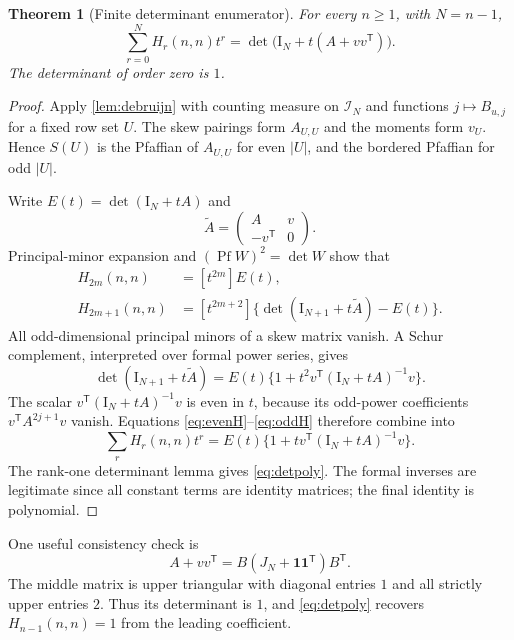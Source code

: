 \documentclass[11pt]{article}
\numberwithin{equation}{section}
\newtheorem{theorem}{Theorem}[section]
\theoremstyle{definition}
\newcommand{\one}{\mathbf{1}}
\newcommand{\Id}{\mathrm{I}}
\newcommand{\Pf}{\operatorname{Pf}}
\newcommand{\coeff}[2]{[#1^{#2}]}
\begin{document}
\begin{theorem}[Finite determinant enumerator]\label{thm:detpoly}
For every $n\geq1$, with $N=n-1$,
\begin{equation}\label{eq:detpoly}
 \boxed{\displaystyle
 \sum_{r=0}^{N}H_r(n,n)t^r
 =\det\bigl(\Id_N+t(A+vv^{\mathsf T})\bigr).}
\end{equation}
The determinant of order zero is $1$.
\end{theorem}

\begin{proof}
Apply \cref{lem:debruijn} with counting measure on $\mathcal I_N$ and functions $j\mapsto B_{u,j}$ for a fixed row set $U$. The skew pairings form $A_{U,U}$ and the moments form $v_U$. Hence $S(U)$ is the Pfaffian of $A_{U,U}$ for even $|U|$, and the bordered Pfaffian for odd $|U|$.

Write $E(t)=\det(\Id_N+tA)$ and
\[
 \widetilde A=\begin{pmatrix}A&v\\-v^{\mathsf T}&0\end{pmatrix}.
\]
Principal-minor expansion and $(\Pf W)^2=\det W$ show that
\begin{align}
 H_{2m}(n,n)&=\coeff{t}{2m}E(t),\label{eq:evenH}\\
 H_{2m+1}(n,n)&=\coeff{t}{2m+2}
      \{\det(\Id_{N+1}+t\widetilde A)-E(t)\}.\label{eq:oddH}
\end{align}
All odd-dimensional principal minors of a skew matrix vanish. A Schur complement, interpreted over formal power series, gives
\[
 \det(\Id_{N+1}+t\widetilde A)
 =E(t)\{1+t^2v^{\mathsf T}(\Id_N+tA)^{-1}v\}.
\]
The scalar $v^{\mathsf T}(\Id_N+tA)^{-1}v$ is even in $t$, because its odd-power coefficients $v^{\mathsf T}A^{2j+1}v$ vanish. Equations \eqref{eq:evenH}--\eqref{eq:oddH} therefore combine into
\[
 \sum_rH_r(n,n)t^r
 =E(t)\{1+t v^{\mathsf T}(\Id_N+tA)^{-1}v\}.
\]
The rank-one determinant lemma gives \eqref{eq:detpoly}. The formal inverses are legitimate since all constant terms are identity matrices; the final identity is polynomial.
\end{proof}

One useful consistency check is
\[
 A+vv^{\mathsf T}=B(J_N+\one\one^{\mathsf T})B^{\mathsf T}.
\]
The middle matrix is upper triangular with diagonal entries $1$ and all strictly upper entries $2$. Thus its determinant is $1$, and \eqref{eq:detpoly} recovers $H_{n-1}(n,n)=1$ from the leading coefficient.
\end{document}

